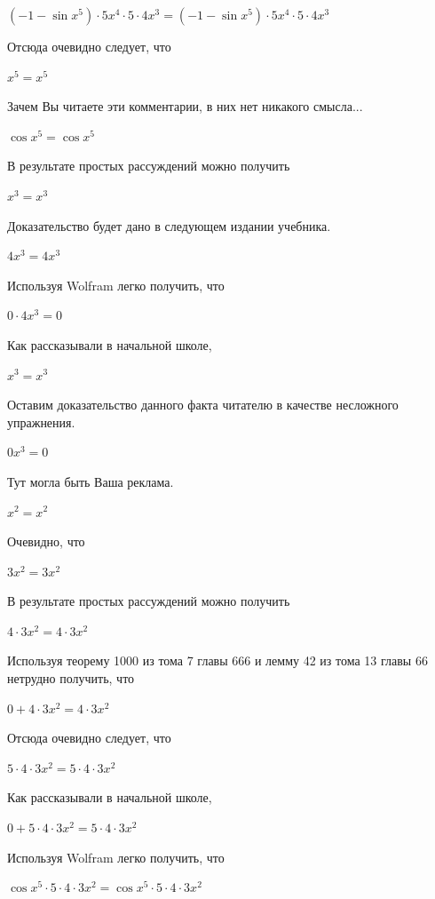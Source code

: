 \documentclass[12pt,a4paper,fleqn]{article}
\theoremstyle{definition}
\begin{document}
$( -1  - \sin{ x }^{ 5 }) \cdot  5 { x }^{ 4 } \cdot  5  \cdot  4 { x }^{ 3 } = ( -1  - \sin{ x }^{ 5 }) \cdot  5 { x }^{ 4 } \cdot  5  \cdot  4 { x }^{ 3 }$

Отсюда очевидно следует, что 

${ x }^{ 5 } = { x }^{ 5 }$

Зачем Вы читаете эти комментарии, в них нет никакого смысла... 

$\cos{ x }^{ 5 } = \cos{ x }^{ 5 }$

В результате простых рассуждений можно получить 

${ x }^{ 3 } = { x }^{ 3 }$

Доказательство будет дано в следующем издании учебника. 

$ 4 { x }^{ 3 } =  4 { x }^{ 3 }$

Используя Wolfram легко получить, что 

$ 0  \cdot  4 { x }^{ 3 } =  0 $

Как рассказывали в начальной школе, 

${ x }^{ 3 } = { x }^{ 3 }$

Оставим доказательство данного факта читателю в качестве несложного упражнения. 

$ 0 { x }^{ 3 } =  0 $

Тут могла быть Ваша реклама. 

${ x }^{ 2 } = { x }^{ 2 }$

Очевидно, что 

$ 3 { x }^{ 2 } =  3 { x }^{ 2 }$

В результате простых рассуждений можно получить 

$ 4  \cdot  3 { x }^{ 2 } =  4  \cdot  3 { x }^{ 2 }$

Используя теорему 1000 из тома 7 главы 666 и лемму 42 из тома 13 главы 66 нетрудно получить, что 

$ 0  +  4  \cdot  3 { x }^{ 2 } =  4  \cdot  3 { x }^{ 2 }$

Отсюда очевидно следует, что 

$ 5  \cdot  4  \cdot  3 { x }^{ 2 } =  5  \cdot  4  \cdot  3 { x }^{ 2 }$

Как рассказывали в начальной школе, 

$ 0  +  5  \cdot  4  \cdot  3 { x }^{ 2 } =  5  \cdot  4  \cdot  3 { x }^{ 2 }$

Используя Wolfram легко получить, что 

$\cos{ x }^{ 5 } \cdot  5  \cdot  4  \cdot  3 { x }^{ 2 } = \cos{ x }^{ 5 } \cdot  5  \cdot  4  \cdot  3 { x }^{ 2 }$
\end{document}

